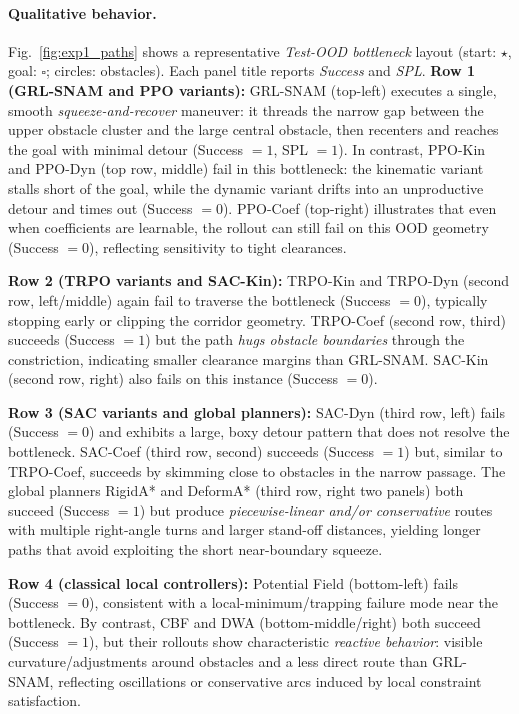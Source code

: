 \paragraph{Qualitative behavior.}
{Fig.~\ref{fig:exp1_paths} shows a representative \emph{Test-OOD bottleneck} layout (start: $\star$, goal: $\square$; circles: obstacles). Each panel title reports \emph{Success} and \emph{SPL}.
\textbf{Row 1 (GRL-SNAM and PPO variants):}
GRL-SNAM (top-left) executes a single, smooth \emph{squeeze-and-recover} maneuver: it threads the narrow gap between the upper obstacle cluster and the large central obstacle, then recenters and reaches the goal with minimal detour (Success $=1$, SPL $=1$). In contrast, PPO-Kin and PPO-Dyn (top row, middle) fail in this bottleneck: the kinematic variant stalls short of the goal, while the dynamic variant drifts into an unproductive detour and times out (Success $=0$). PPO-Coef (top-right) illustrates that even when coefficients are learnable, the rollout can still fail on this OOD geometry (Success $=0$), reflecting sensitivity to tight clearances.

\textbf{Row 2 (TRPO variants and SAC-Kin):}
TRPO-Kin and TRPO-Dyn (second row, left/middle) again fail to traverse the bottleneck (Success $=0$), typically stopping early or clipping the corridor geometry. TRPO-Coef (second row, third) succeeds (Success $=1$) but the path \emph{hugs obstacle boundaries} through the constriction, indicating smaller clearance margins than GRL-SNAM. SAC-Kin (second row, right) also fails on this instance (Success $=0$).

\textbf{Row 3 (SAC variants and global planners):}
SAC-Dyn (third row, left) fails (Success $=0$) and exhibits a large, boxy detour pattern that does not resolve the bottleneck. SAC-Coef (third row, second) succeeds (Success $=1$) but, similar to TRPO-Coef, succeeds by skimming close to obstacles in the narrow passage. The global planners RigidA* and DeformA* (third row, right two panels) both succeed (Success $=1$) but produce \emph{piecewise-linear and/or conservative} routes with multiple right-angle turns and larger stand-off distances, yielding longer paths that avoid exploiting the short near-boundary squeeze.

\textbf{Row 4 (classical local controllers):}
Potential Field (bottom-left) fails (Success $=0$), consistent with a local-minimum/trapping failure mode near the bottleneck. By contrast, CBF and DWA (bottom-middle/right) both succeed (Success $=1$), but their rollouts show characteristic \emph{reactive behavior}: visible curvature/adjustments around obstacles and a less direct route than GRL-SNAM, reflecting oscillations or conservative arcs induced by local constraint satisfaction.}

